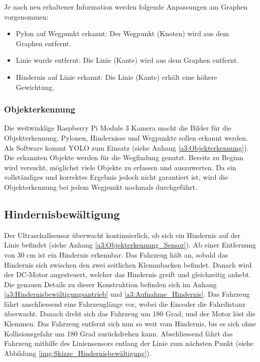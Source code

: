 \documentclass[../main.tex]{subfiles}
\begin{document}
Je nach neu erhaltener Information werden folgende Anpassungen am Graphen vorgenommen: \begin{itemize} 
  \item Pylon auf Wegpunkt erkannt: Der Wegpunkt (Knoten) wird aus dem Graphen entfernt.
  \item Linie wurde entfernt: Die Linie (Kante) wird aus dem Graphen entfernt. 
  \item Hindernis auf Linie erkannt: Die Linie (Kante) erhält eine höhere Gewichtung.
\end{itemize}

\subsubsection{Objekterkennung} \label{sub:Objekterkennung}
Die weitwinklige Raspberry Pi Module 3 Kamera macht die Bilder für die Objekterkennung. Pylonen, Hindernisse und Wegpunkte sollen erkannt werden. Als Software kommt YOLO zum Einsatz (siehe Anhang \ref{a3:Objekterkennung}). Die erkannten Objekte werden für die Wegfindung genutzt. Bereits zu Beginn wird versucht, möglichst viele Objekte zu erfassen und auszuwerten. Da ein vollständiges und korrektes Ergebnis jedoch nicht garantiert ist, wird die Objekterkennung bei jedem Wegpunkt nochmals durchgeführt. 

\subsection{Hindernisbewältigung}
Der Ultraschallsensor überwacht kontinuierlich, ob sich ein Hindernis auf der Linie befindet (siehe Anhang \ref{a3:Objekterkennung_Sensor}). Ab einer Entfernung von 30 cm ist ein Hindernis erkennbar. Das Fahrzeug hält an, sobald das Hindernis sich zwischen den zwei seitlichen Klemmbacken befindet. Danach wird der DC-Motor angesteuert, welcher das Hindernis greift und gleichzeitig anhebt. Die genauen Details zu dieser Konstruktion befinden sich im Anhang \ref{a3:Hindernisbewältigungsantrieb} und \ref{a3:Aufnahme_Hindernis}.
Das Fahrzeug fährt anschliessend eine Fahrzeuglänge vor, wobei die Encoder die Fahrdistanz überwacht. Danach dreht sich das Fahrzeug um 180 Grad, und der Motor löst die Klemmen. Das Fahrzeug entfernt sich nun so weit vom Hindernis, bis es sich ohne Kollisionsgefahr um 180 Grad zurückdrehen kann. Abschliessend fährt das Fahrzeug mithilfe des Liniensensors entlang der Linie zum nächsten Punkt (siehe Abbildung \ref{img:Skizze_Hindernisbewältigung}).
\end{document}
